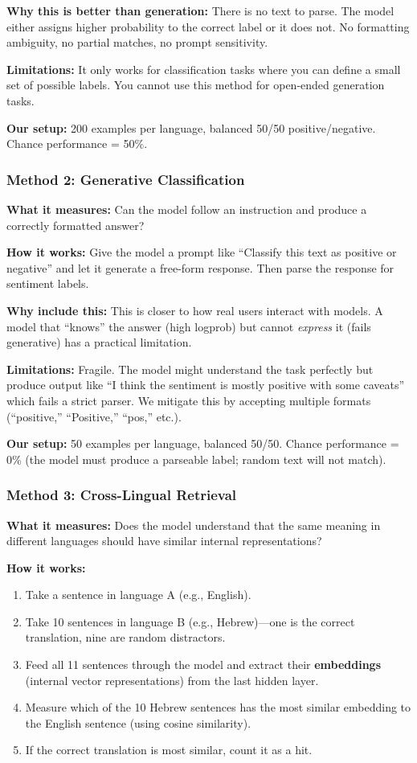 \documentclass[11pt,a4paper]{article}
\begin{document}
\textbf{Why this is better than generation:} There is no text to parse. The model either assigns higher probability to the correct label or it does not. No formatting ambiguity, no partial matches, no prompt sensitivity.

\textbf{Limitations:} It only works for classification tasks where you can define a small set of possible labels. You cannot use this method for open-ended generation tasks.

\textbf{Our setup:} 200 examples per language, balanced 50/50 positive/negative. Chance performance = 50\%.

\subsubsection{Method 2: Generative Classification}

\textbf{What it measures:} Can the model follow an instruction and produce a correctly formatted answer?

\textbf{How it works:} Give the model a prompt like ``Classify this text as positive or negative'' and let it generate a free-form response. Then parse the response for sentiment labels.

\textbf{Why include this:} This is closer to how real users interact with models. A model that ``knows'' the answer (high logprob) but cannot \emph{express} it (fails generative) has a practical limitation.

\textbf{Limitations:} Fragile. The model might understand the task perfectly but produce output like ``I think the sentiment is mostly positive with some caveats'' which fails a strict parser. We mitigate this by accepting multiple formats (``positive,'' ``Positive,'' ``pos,'' etc.).

\textbf{Our setup:} 50 examples per language, balanced 50/50. Chance performance = 0\% (the model must produce a parseable label; random text will not match).

\subsubsection{Method 3: Cross-Lingual Retrieval}

\textbf{What it measures:} Does the model understand that the same meaning in different languages should have similar internal representations?

\textbf{How it works:}
\begin{enumerate}
    \item Take a sentence in language A (e.g., English).
    \item Take 10 sentences in language B (e.g., Hebrew)---one is the correct translation, nine are random distractors.
    \item Feed all 11 sentences through the model and extract their \textbf{embeddings} (internal vector representations) from the last hidden layer.
    \item Measure which of the 10 Hebrew sentences has the most similar embedding to the English sentence (using cosine similarity).
    \item If the correct translation is most similar, count it as a hit.
\end{enumerate}
\end{document}
